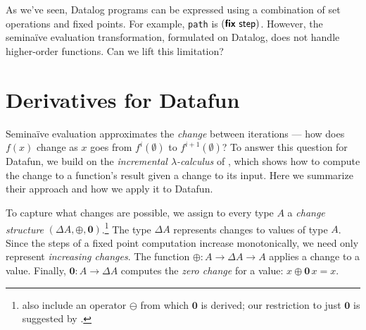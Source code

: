 \documentclass[sigplan,screen,review,timestamp,dvipsnames]{acmart}
\newcommand{\naive}{na\"ive}
\newcommand{\Naive}{Na\"ive}
\newcommand{\D}{\Delta}
\renewcommand{\d}{\delta}
\newcommand{\zero}{\mathbf{0}}
\newcommand{\kw}[1]{\textsf{\bfseries #1}}
\newcommand{\tlv}[1]{\textsf{#1}}
\newcommand{\var}[1]{\mathit{#1}}
\newcommand{\dee}[1]{\var{d#1}}
\newcommand{\efix}{\kw{fix}~}
\begin{document}
As we've seen, Datalog programs can be expressed using a combination of set
operations and fixed points. For example, \texttt{path} is
$(\efix{\tlv{step}})$. However, the semi\naive{} evaluation transformation,
formulated on Datalog, does not handle higher-order functions. Can we lift this limitation?

\section{Derivatives for Datafun}




%
Semi\naive{} evaluation approximates the \emph{change} between iterations ---
how does $f(x)$ change as $x$ goes from $f^{i}(\emptyset)$ to
$f^{i+1}(\emptyset)$?
%
To answer this question for Datafun, we build on the \emph{incremental
  $\lambda$-calculus} of \citet{incremental}, which shows how to compute the
change to a function's result given a change to its input.
%
Here we summarize their approach and how we apply it to Datafun.


To capture what changes are possible, we assign to every type $A$ a \emph{change
  structure} $(\D A, \oplus, \zero)$.\footnote{ also
  include an operator $\ominus$ from which $\zero$ is derived; our restriction
  to just $\zero$ is suggested by \citet{atkey-changes}.}
%
The type $\D A$ represents changes to values of type $A$. Since the steps of a fixed point computation increase monotonically, we need only represent \emph{increasing changes}.
%
The function $\oplus : A \to \Delta A \to A$ applies a change to a value.
Finally, $\zero : A \to \Delta A$ computes the \emph{zero change} for a value:
$x \oplus \zero\,x = x$.
\end{document}
